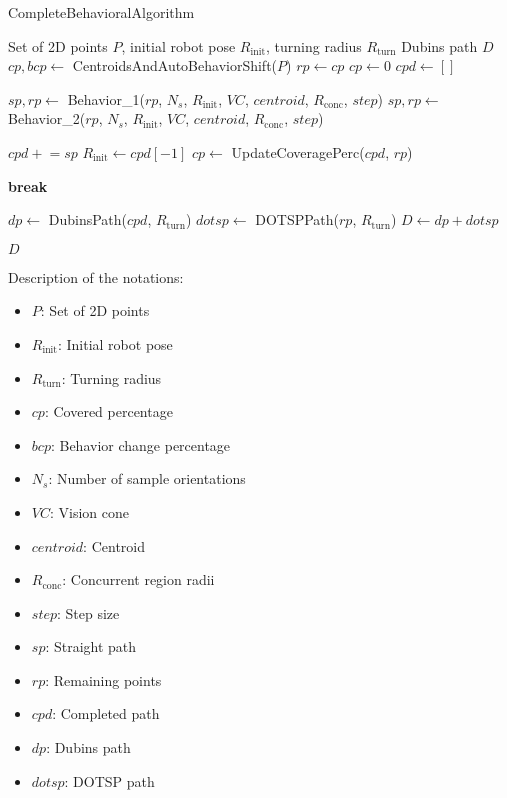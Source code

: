 \begin{algorithm}[H]
    \caption{CompleteBehavioralAlgorithm}
    \label{alg:completebehavioralalgorithm}
    \begin{algorithmic}[1]
    \Require Set of 2D points $P$, initial robot pose $R_{\text{init}}$, turning radius $R_{\text{turn}}$ 
    \Ensure Dubins path $D$
    \State $cp, bcp \leftarrow$ CentroidsAndAutoBehaviorShift($P$)
    \State $rp \leftarrow cp$
    \State $cp \leftarrow 0$
    \State $cpd \leftarrow []$
    
            \State $sp, rp \leftarrow$ Behavior\_1($rp$, $N_s$, $R_{\text{init}}$, $VC$, $centroid$, $R_{\text{conc}}$, $step$)
        \Else
            \State $sp, rp \leftarrow$ Behavior\_2($rp$, $N_s$, $R_{\text{init}}$, $VC$, $centroid$, $R_{\text{conc}}$, $step$)
        \EndIf
        
        \State $cpd \mathrel{+}= sp$
        \State $R_{\text{init}} \leftarrow cpd[-1]$
        \State $cp \leftarrow$ UpdateCoveragePerc($cpd$, $rp$)
        
            \State \textbf{break}
        \EndIf
    \EndWhile
    
    \State $dp \leftarrow$ DubinsPath($cpd$, $R_{\text{turn}}$)
    \State $dotsp \leftarrow$ DOTSPPath($rp$, $R_{\text{turn}}$)
    \State $D \leftarrow dp + dotsp$

    \State \Return $D$
    \end{algorithmic}
\end{algorithm}
    
    Description of the notations:
    \begin{itemize}[noitemsep,topsep=0pt]
        \item $P$: Set of 2D points
        \item $R_{\text{init}}$: Initial robot pose
        \item $R_{\text{turn}}$: Turning radius
        \item $cp$: Covered percentage
        \item $bcp$: Behavior change percentage
        \item $N_s$: Number of sample orientations
        \item $VC$: Vision cone
        \item $centroid$: Centroid
        \item $R_{\text{conc}}$: Concurrent region radii
        \item $step$: Step size
        \item $sp$: Straight path
        \item $rp$: Remaining points
        \item $cpd$: Completed path
        \item $dp$: Dubins path
        \item $dotsp$: DOTSP path
    \end{itemize}
    

